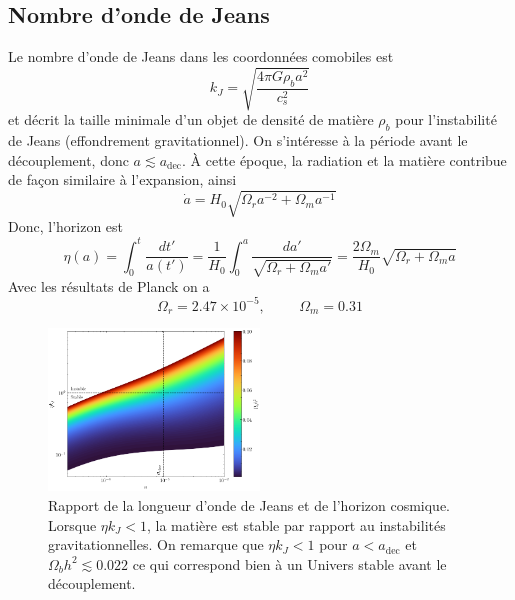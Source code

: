 \documentclass{article}
\numberwithin{equation}{section}
\begin{document}
\subsection{Nombre d'onde de Jeans}
Le nombre d'onde de Jeans dans les coordonnées comobiles est 
\[
        k_J = \sqrt{\frac{4\pi G \rho_b a^2}{c_s^2}}
\]
et décrit la taille minimale d'un objet de densité de matière $\rho_b$ 
pour l'instabilité de Jeans (effondrement gravitationnel). 
On s'intéresse à la période avant le découplement, donc 
$a \lesssim a_{\text{dec}}$. À cette époque, la radiation 
et la matière contribue de façon similaire à l'expansion, ainsi 
\[
        \dot{a} = H_0 \sqrt{\Omega_r a^{-2} + \Omega_m a^{-1} } 
\]
Donc, l'horizon est
\[
        \eta(a) = \int_{0}^{t} \frac{dt'}{a(t')} 
        = \frac{1}{H_0}\int_0^{a}\frac{da'}{\sqrt{\Omega_r + \Omega_m a'}}
        = \frac{2\Omega_m}{H_0} \sqrt{\Omega_r + \Omega_m a}
\]
Avec les résultats de Planck on a
\[
        \Omega_r = 2.47\times 10^{-5}, \hspace{1cm} \Omega_m = 0.31
\]

\begin{figure}[H]
        \centering
        \includegraphics[width=0.5\textwidth]{eta_kj}
        \caption{Rapport de la longueur d'onde de Jeans et de l'horizon cosmique. 
        Lorsque $\eta k_J < 1$, la matière est stable par rapport au instabilités gravitationnelles. On 
remarque que $\eta k_J < 1$ pour $a < a_{\text{dec}}$ et $\Omega_b h^2 \lesssim 0.022$ 
ce qui correspond bien à un Univers stable avant 
le découplement.}
\end{figure}
\end{document}
